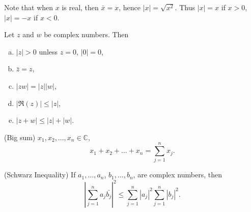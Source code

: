 Note that when $x$ is real, then $\bar{x} = x$, 
hence $|x| = \sqrt{x^2}$. Thus $|x| = x$
if $x>0$, $|x| = -x$ if $x <0$.

\begin{thm}
    \label{thm:1.33}
    Let $z$ and $w$ be complex numbers. Then
    \begin{enumerate}[(a)]
        \item $|z|>0$ unless $z=0$, $|0|=0$,
        \item $\bar{z}=z$,
        \item $|zw| = |z||w|$,
        \item $| \Re(z)| \leq |z|$,
        \item $|z+w| \leq|z|+|w|$.
    \end{enumerate}
\end{thm}


\begin{myNotation}(Big sum)
    \label{myNotation:1.34}
    $x_1,x_2,\dots,x_n \in \mathbb{C}$,
    \begin{equation*}
        x_1+x_2+\dots+x_n = \sum_{j=1}^{n} x_j.
    \end{equation*}
\end{myNotation}

\begin{thm}(Schwarz Inequality)
    \label{thm:1.35}
    If 
    $a_1,\dots,a_n$, 
    $b_1,\dots,b_n$, are complex numbers, then
    \begin{equation*}
        \left| \sum_{j=1}^{n}a_j \bar{b_j}\right|^2 \leq 
        \sum_{j=1}^{n}\left|a_j\right|^2
        \sum_{j=1}^{n}\left|b_j\right|^2.
    \end{equation*}    
\end{thm}


